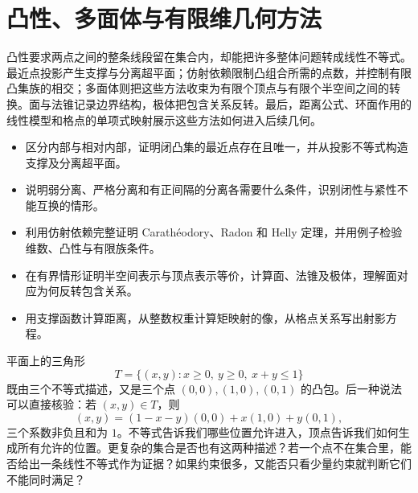 
% 
% 

\chapter{凸性、多面体与有限维几何方法}
\label{g1:ch:03}

\begin{chapterabstract}
	凸性要求两点之间的整条线段留在集合内，却能把许多整体问题转成线性不等式。最近点投影产生支撑与分离超平面；仿射依赖限制凸组合所需的点数，并控制有限凸集族的相交；多面体则把这些方法收束为有限个顶点与有限个半空间之间的转换。面与法锥记录边界结构，极体把包含关系反转。最后，距离公式、环面作用的线性模型和格点的单项式映射展示这些方法如何进入后续几何。
\end{chapterabstract}

\begin{learninggoals}
	\begin{itemize}
		\item 区分内部与相对内部，证明闭凸集的最近点存在且唯一，并从投影不等式构造支撑及分离超平面。
		\item 说明弱分离、严格分离和有正间隔的分离各需要什么条件，识别闭性与紧性不能互换的情形。
		\item 利用仿射依赖完整证明 Carathéodory、Radon 和 Helly 定理，并用例子检验维数、凸性与有限族条件。
		\item 在有界情形证明半空间表示与顶点表示等价，计算面、法锥及极体，理解面对应为何反转包含关系。
		\item 用支撑函数计算距离，从整数权重计算矩映射的像，从格点关系写出射影方程。
	\end{itemize}
\end{learninggoals}

平面上的三角形
\[
	T=\{(x,y):x\ge0,\ y\ge0,\ x+y\le1\}
\]
既由三个不等式描述，又是三个点 \((0,0),(1,0),(0,1)\) 的凸包。后一种说法可以直接核验：若 \((x,y)\in T\)，则
\[
	(x,y)=(1-x-y)(0,0)+x(1,0)+y(0,1),
\]
三个系数非负且和为 \(1\)。不等式告诉我们哪些位置允许进入，顶点告诉我们如何生成所有允许的位置。更复杂的集合是否也有这两种描述？若一个点不在集合里，能否给出一条线性不等式作为证据？如果约束很多，又能否只看少量约束就判断它们不能同时满足？

